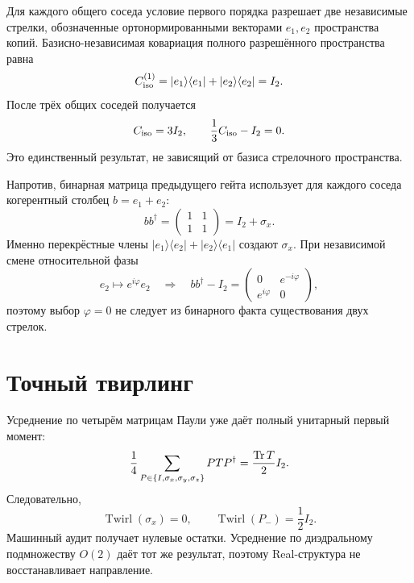 Для каждого общего соседа условие первого порядка разрешает две независимые
стрелки, обозначенные ортонормированными векторами $e_1,e_2$ пространства
копий. Базисно-независимая ковариация полного разрешённого пространства
равна
\begin{equation}
 C_{\rm iso}^{(1)}
 =|e_1\rangle\langle e_1|+|e_2\rangle\langle e_2|
 =I_2.
 \label{eq:v7-incidence-incoherent-one-neighbour}
\end{equation}
После трёх общих соседей получается
\begin{equation}
 C_{\rm iso}=3I_2,
 \qquad
 \frac13C_{\rm iso}-I_2=0.
 \label{eq:v7-incidence-incoherent-three-neighbours}
\end{equation}
Это единственный результат, не зависящий от базиса стрелочного пространства.

Напротив, бинарная матрица предыдущего гейта использует для каждого соседа
когерентный столбец $b=e_1+e_2$:
\begin{equation}
 bb^\dagger
 =\begin{pmatrix}1&1\\1&1\end{pmatrix}
 =I_2+\sigma_x.
 \label{eq:v7-incidence-coherent-column}
\end{equation}
Именно перекрёстные члены
$|e_1\rangle\langle e_2|+|e_2\rangle\langle e_1|$ создают
$\sigma_x$. При независимой смене относительной фазы
\begin{equation}
 e_2\longmapsto e^{i\varphi}e_2
 \quad\Longrightarrow\quad
 bb^\dagger-I_2
 =\begin{pmatrix}0&e^{-i\varphi}\\e^{i\varphi}&0\end{pmatrix},
 \label{eq:v7-incidence-relative-phase-orbit}
\end{equation}
поэтому выбор $\varphi=0$ не следует из бинарного факта существования двух
стрелок.

\section{Точный твирлинг}

Усреднение по четырём матрицам Паули уже даёт полный унитарный первый момент:
\begin{equation}
 \frac14\sum_{P\in\{I,\sigma_x,\sigma_y,\sigma_z\}}
 PTP^\dagger=\frac{\operatorname{Tr} T}{2}I_2.
 \label{eq:v7-incidence-pauli-twirl}
\end{equation}
Следовательно,
\begin{equation}
 \operatorname{Twirl}(\sigma_x)=0,
 \qquad
 \operatorname{Twirl}(P_-)=\frac12I_2.
 \label{eq:v7-incidence-selector-twirl}
\end{equation}
Машинный аудит получает нулевые остатки. Усреднение по диэдральному
подмножеству $O(2)$ даёт тот же результат, поэтому Real-структура не
восстанавливает направление.

